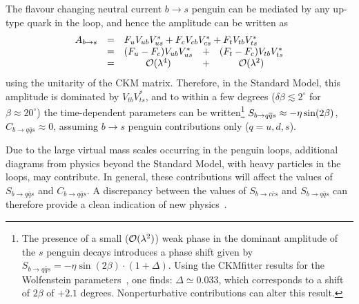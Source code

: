 \clearpage
{}
\label{sec:cp_uta:qqs}

The flavour changing neutral current $b \to s$ penguin
can be mediated by any up-type quark in the loop, 
and hence the amplitude can be written as
\begin{equation}
  \label{eq:cp_uta:b_to_s}
  \begin{array}{ccccc}
    A_{b \to s} & = & 
    \mc{3}{l}{F_u V_{ub}V^*_{us} + F_c V_{cb}V^*_{cs} + F_t V_{tb}V^*_{ts}} \\
    & = & (F_u - F_c) V_{ub}V^*_{us} & + & (F_t - F_c) V_{tb}V^*_{ts} \\
    & = & {\cal O}(\lambda^4) & + & {\cal O}(\lambda^2) \\
  \end{array}
\end{equation}
using the unitarity of the CKM matrix.
Therefore, in the Standard Model, 
this amplitude is dominated by $V_{tb}V^*_{ts}$, 
and to within a few degrees 
($\delta\beta \lesssim 2^\circ$ for $\beta \approx 20^\circ$) 
the time-dependent parameters can be written\footnote
{
  The presence of a small (${\cal O}(\lambda^2)$) weak phase in 
  the dominant amplitude of the $s$ penguin decays introduces 
  a phase shift given by
  $S_{b \to q\bar q s} = -\eta\sin(2\beta)\cdot(1 + \Delta)$. 
  Using the CKMfitter results for the Wolfenstein 
  parameters~\cite{Charles:2004jd}, one finds: 
  $\Delta \simeq 0.033$, which corresponds to a shift of 
  $2\beta$ of $+2.1$ degrees. 
  Nonperturbative contributions can alter this result.
}
$S_{b \to q\bar q s} \approx - \etacp \sin(2\beta)$,
$C_{b \to q\bar q s} \approx 0$,
assuming $b \to s$ penguin contributions only ($q = u,d,s$).

Due to the large virtual mass scales occurring in the penguin loops,
additional diagrams from physics beyond the Standard Model,
with heavy particles in the loops, may contribute.
In general, these contributions will affect the values of 
$S_{b \to q\bar q s}$ and $C_{b \to q\bar q s}$.
A discrepancy between the values of 
$S_{b \to c\bar c s}$ and $S_{b \to q\bar q s}$
can therefore provide a clean indication of new physics~\cite{Grossman:1996ke,Fleischer:1996bv,London:1997zk,Ciuchini:1997zp}.

